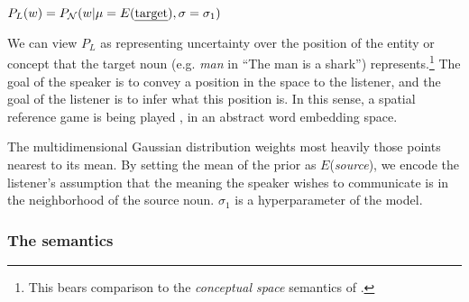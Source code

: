 \documentclass[OpenMind]{stjour}
\begin{document}
		\begin{exe}
		\ex $P_L(w) = P_{\mathcal{N}}(w\vert\mu=E(\textrm{\emph{target}}),\sigma=\sigma_1)$ \label{vect:prior}
		\end{exe}

		We can view $P_L$ as representing uncertainty over the position of the entity or concept that the target noun (e.g. \emph{man} in ``The man is a shark'') represents.\footnote{This bears comparison to the \emph{conceptual space} semantics of \citet{gardenfors2004conceptual}.}
		The goal of the speaker is to convey a position in the space 
		to the listener, and the goal of the listener is to infer what this position is. In this sense, a spatial reference game is being played  \citep{golland2010game}, in an abstract word embedding space.

		
		


		The multidimensional Gaussian distribution weights most heavily those points nearest to its mean. By setting the mean of the prior as $E$(\emph{source}), we encode the listener's assumption that the meaning the speaker wishes to communicate is in the neighborhood of the source noun. $\sigma_1$ is a hyperparameter of the model.


			


	\subsubsection{The semantics}
\end{document}

